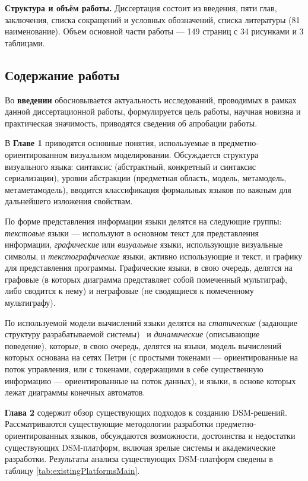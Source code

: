 \textbf{Структура и объём работы.} Диссертация состоит из введения, пяти глав, заключения, 
списка сокращений и условных обозначений, списка литературы (81 наименование). Объем основной 
части работы --- 149 страниц с 34 рисунками и 3 таблицами.

\subsection*{\Large Содержание работы}
Во \textbf{введении} обосновывается актуальность исследований, проводимых в рамках 
данной диссертационной работы, формулируется цель работы, научная новизна и практическая 
значимость, приводятся сведения об апробации работы.

В \textbf{Главе 1} приводятся основные понятия, используемые в 
предметно-ориентированном визуальном моделировании. Обсуждается структура 
визуального языка: синтаксис (абстрактный, конкретный и синтаксис сериализации), 
уровни абстракции (предметная область, модель, метамодель, метаметамодель), вводится 
классификация формальных языков по важным для дальнейшего изложения свойствам.

По форме представления информации языки делятся на следующие группы: \textit{текстовые} языки 
--- используют в основном текст для представления информации, \textit{графические} или 
\textit{визуальные} языки, использующие визуальные символы, и \textit{текстографические} языки,
активно использующие и текст, и графику для представления программы. Графические языки, в свою очередь, 
делятся на графовые (в которых диаграмма представляет собой помеченный мультиграф, либо сводится к нему)
и неграфовые (не сводящиеся к помеченному мультиграфу).

По используемой модели вычислений языки делятся на \textit{статические} (задающие структуру разрабатываемой системы) \
и \textit{динамические} (описывающие поведение), которые, в свою очередь, делятся на языки, 
модель вычислений которых основана на сетях Петри (с простыми токенами --- ориентированные на поток управления,
или с токенами, содержащими в себе существенную информацию --- ориентированные на поток данных),
и языки, в основе которых лежат диаграммы конечных автоматов.

\textbf{Глава 2} содержит обзор существующих подходов к созданию DSM-решений. 
Рассматриваются существующие методологии разработки предметно-ориентированных языков,
обсуждаются возможности, достоинства и недостатки существующих DSM-платформ, 
включая зрелые системы и академические разработки. Результаты анализа существующих 
DSM-платформ сведены в таблицу \ref{tab:existingPlatformsMain}.

